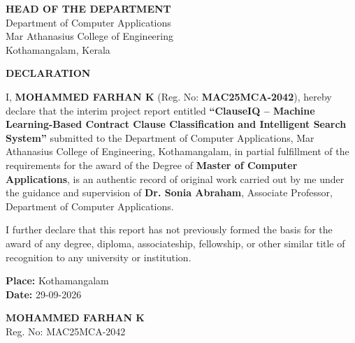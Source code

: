 \documentclass[12pt, a4paper]{report}
\begin{document}
\vspace{0.8in}

\begin{center}
    \textbf{HEAD OF THE DEPARTMENT}\\
    Department of Computer Applications\\
    Mar Athanasius College of Engineering\\
    Kothamangalam, Kerala
\end{center}

\newpage
{}
\setcounter{page}{1}

\begin{center}
    {\bfseries\fontsize{16}{19}\selectfont DECLARATION\par}
\end{center}

\vspace{0.2in}

{\justifying\fontsize{12}{17}\selectfont
I, \textbf{MOHAMMED FARHAN K} (Reg. No: \textbf{MAC25MCA-2042}), hereby declare that the interim project report entitled \textbf{``ClauseIQ -- Machine Learning-Based Contract Clause Classification and Intelligent Search System''} submitted to the Department of Computer Applications, Mar Athanasius College of Engineering, Kothamangalam, in partial fulfillment of the requirements for the award of the Degree of \textbf{Master of Computer Applications}, is an authentic record of original work carried out by me under the guidance and supervision of \textbf{Dr. Sonia Abraham}, Associate Professor, Department of Computer Applications.

I further declare that this report has not previously formed the basis for the award of any degree, diploma, associateship, fellowship, or other similar title of recognition to any university or institution.\par}

\vspace{0.8in}

\noindent
\begin{minipage}[t]{0.5\textwidth}
    \textbf{Place:} Kothamangalam\\
    \textbf{Date:} 29-09-2026
\end{minipage}
\hfill
\begin{minipage}[t]{0.4\textwidth}
    \raggedleft
    \textbf{MOHAMMED FARHAN K}\\
    Reg. No: MAC25MCA-2042
\end{minipage}
\end{document}
